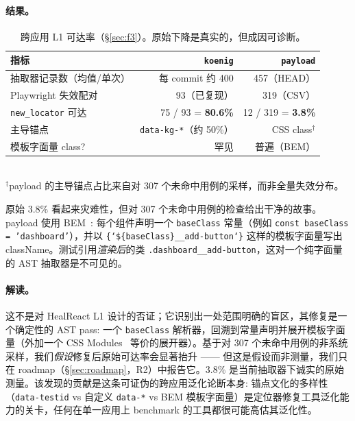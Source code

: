 \paragraph{结果。}
\begin{table}[t]
\centering
\caption{跨应用 L1 可达率（\S\ref{sec:f3}）。原始下降是真实的，但成因可诊断。}
\label{tab:cross-app}
\small
\begin{tabular}{lrr}
\toprule
指标 & \texttt{koenig} & \texttt{payload} \\
\midrule
抽取器记录数（均值/单次） & 每 commit 约 400 & 457（HEAD） \\
Playwright 失效配对 & 93（已复现） & 319（CSV） \\
\texttt{new\_locator} 可达 & 75 / 93 = \textbf{80.6\%} & 12 / 319 = \textbf{3.8\%} \\
\midrule
主导锚点 & \texttt{data-kg-*}（约 50\%） & CSS class$^\dagger$ \\
模板字面量 class? & 罕见 & 普遍（BEM） \\
\bottomrule
\end{tabular}
\\[2pt]
{\scriptsize $^\dagger$payload 的主导锚点占比来自对 307 个未命中用例的采样，而非全量失效分布。}
\end{table}

原始 3.8\% 看起来灾难性，但对 307 个未命中用例的检查给出干净的故事。payload 使用 BEM~\cite{bemMethodology}: 每个组件声明一个 \texttt{baseClass} 常量（例如 \texttt{const baseClass = 'dashboard'}），并以 \texttt{\{`\$\{baseClass\}\_\_add-button`\}} 这样的模板字面量写出 className。测试引用\emph{渲染后}的类 \texttt{.dashboard\_\_add-button}，这对一个纯字面量的 AST 抽取器是不可见的。

\paragraph{解读。}
这不是对 HealReact L1 设计的否证；它识别出一处范围明确的盲区，其修复是一个确定性的 AST pass: 一个 \texttt{baseClass} 解析器，回溯到常量声明并展开模板字面量（外加一个 CSS Modules~\cite{cssModules} 等价的展开器）。基于对 307 个未命中用例的非系统采样，我们\emph{假设}修复后原始可达率会显著抬升 —— 但这是假设而非测量，我们只在 roadmap（\S\ref{sec:roadmap}，R2）中报告它。3.8\% 是当前抽取器下诚实的原始测量。该发现的贡献是这条可证伪的跨应用泛化论断本身: 锚点文化的多样性（\texttt{data-testid} vs 自定义 \texttt{data-*} vs BEM 模板字面量）是定位器修复工具泛化能力的关卡，任何在单一应用上 benchmark 的工具都很可能高估其泛化性。
